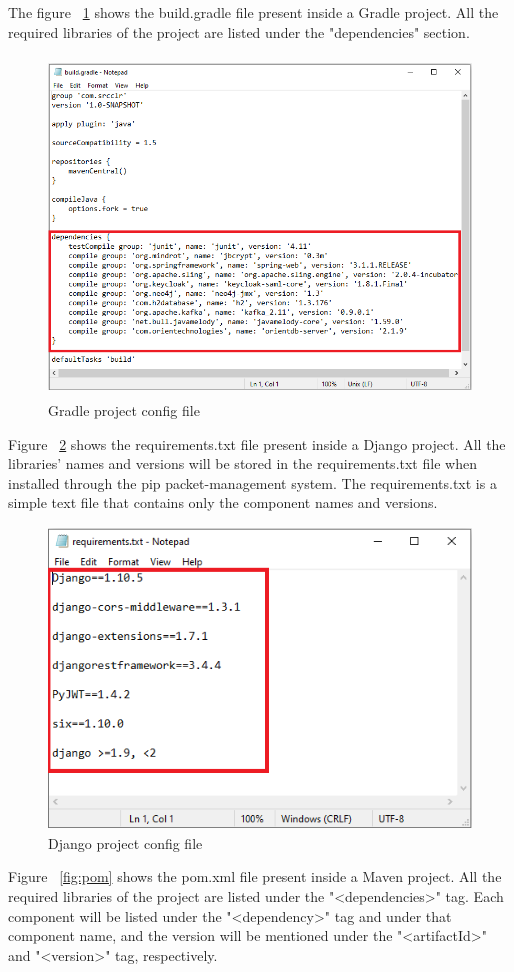 The figure ~\ref{fig:gradle} shows the build.gradle file present inside a Gradle project. All the required libraries of the project are listed under the "dependencies" section.
\begin{figure}[H]
	\includegraphics[width=15cm,height=9cm]{includes/gradle.PNG}
	\centering
	\caption{Gradle project config file}
	\label{fig:gradle}
\end{figure}
Figure ~\ref{fig:django} shows the requirements.txt file present inside a Django project. All the libraries' names and versions will be stored in the requirements.txt file when installed through the pip packet-management system. The requirements.txt is a simple text file that contains only the component names and versions. 
\begin{figure}[H]
	\includegraphics[width=15cm,height=8cm]{includes/django.PNG}
	\centering
	\caption{Django project config file}
	\label{fig:django}
\end{figure}
Figure ~\ref{fig:pom} shows the pom.xml file present inside a Maven project. All the required libraries of the project are listed under the "<dependencies>" tag. Each component will be listed under the "<dependency>" tag and under that component name, and the version will be mentioned under the "<artifactId>" and "<version>" tag, respectively.
